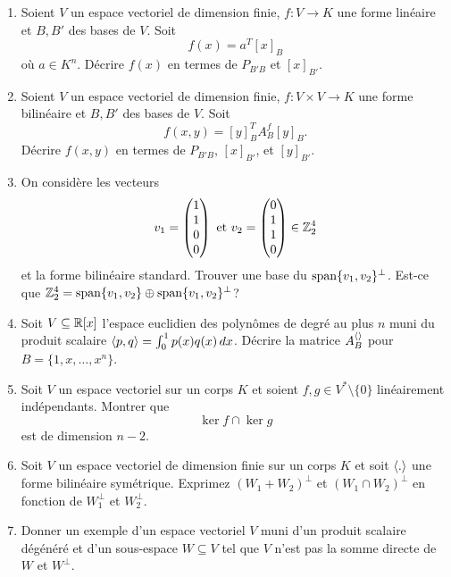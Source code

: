 \begin{enumerate}
\item Soient $V$ un espace vectoriel de dimension finie,  $f: V \longrightarrow K$ une forme linéaire et $B,B'$ des bases de $V$. Soit 
  \begin{displaymath}
    f(x) = a^T [x]_B 
  \end{displaymath}
  où $a \in K^n$. 
  Décrire $f(x)$ en termes de $P_{B'B}$ et $[x]_{B'}$. 
\item Soient $V$ un espace vectoriel de dimension finie,  $f: V\times V \longrightarrow K$ une forme bilinéaire et $B,B'$ des bases de $V$. Soit 
  \begin{displaymath}
    f(x,y) = [y]_B ^T A_B^f [y]_B.  
  \end{displaymath}
  Décrire $f(x,y)$ en termes de $P_{B'B}$, $[x]_{B'}$, et $[y]_{B'}$. 
\item On considère les vecteurs 
  \begin{displaymath}
    v_1 =
    \begin{pmatrix}
      1\\1\\0\\0
    \end{pmatrix} \text{ et }
 v_2 =
    \begin{pmatrix}
      0\\1\\1\\0
    \end{pmatrix} \in \mathbb{Z}_2^4
  \end{displaymath}
et la forme bilinéaire standard. Trouver une base du $\operatorname{span}\{v_1,v_2\}^\perp$. Est-ce que $\mathbb{Z}_2^4 = \operatorname{span}\{v_1,v_2\} \oplus \operatorname{span}\{v_1,v_2\}^\perp$? 
\item Soit $V \subseteq \mathbb{R}[x]$ l'espace euclidien des polynômes de degré au plus $n$ muni du produit scalaire  $\langle {p,q} \rangle = \int_0^1p(x)q(x) \, dx$.  Décrire la matrice $A_B^{\langle {} \rangle}$ pour $B = \{1,x,\dots,x^n\}$. 
\item Soit $V$ un espace vectoriel sur un corps $K$ et soient $f,g \in V^* \setminus \{0\}$ linéairement indépendants. Montrer que
  \begin{displaymath}
    \ker{f} \cap \ker{g} 
  \end{displaymath}
est de dimension $n-2$. 
\item Soit $V$ un espace vectoriel de dimension finie sur un corps $K$ et soit $\langle {.} \rangle$ une forme bilinéaire symétrique. Exprimez $(W_1 +W_2)^\perp$ et $(W_1\cap W_2)^\perp$ en fonction de $W_1^\perp$ et $W_2^\perp$. 


\item Donner un exemple d'un espace vectoriel  $V$ muni d'un produit scalaire dégénéré et d'un sous-espace $W \subseteq V$  tel que $V$ n'est pas la somme directe de $W$ et $W^\perp$. 
\end{enumerate}








